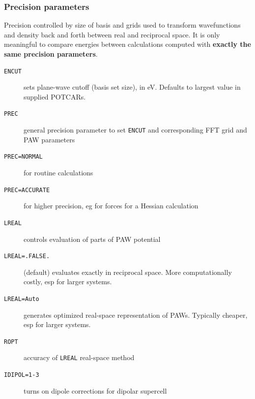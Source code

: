 \documentclass[11pt]{article}
\begin{document}
\subsubsection{Precision parameters}
\label{sec:org279f4ee}
Precision controlled by size of basis and grids used to transform wavefunctions and density back and forth between real and reciprocal space. It is only meaningful to compare energies between calculations computed with \textbf{exactly the same precision parameters}.
\begin{description}
\item[{\texttt{ENCUT}}] sets plane-wave cutoff (basis set size), in eV.  Defaults to largest value in supplied POTCARs.
\item[{\texttt{PREC}}] general precision parameter to set \texttt{ENCUT} and corresponding FFT grid and PAW parameters
\item[{\texttt{PREC=NORMAL}}] for routine calculations
\item[{\texttt{PREC=ACCURATE}}] for higher precision, eg for forces for a Hessian calculation
\item[{\texttt{LREAL}}] controls evaluation of parts of PAW potential
\item[{\texttt{LREAL=.FALSE.}}] (default) evaluates exactly in reciprocal space. More computationally costly, esp for larger systems.
\item[{\texttt{LREAL=Auto}}] generates optimized real-space representation of PAWs.  Typically cheaper, esp for larger systems.
\item[{\texttt{ROPT}}] accuracy of \texttt{LREAL} real-space method
\item[{\texttt{IDIPOL=1-3}}] turns on dipole corrections for dipolar supercell
\end{description}
\end{document}
